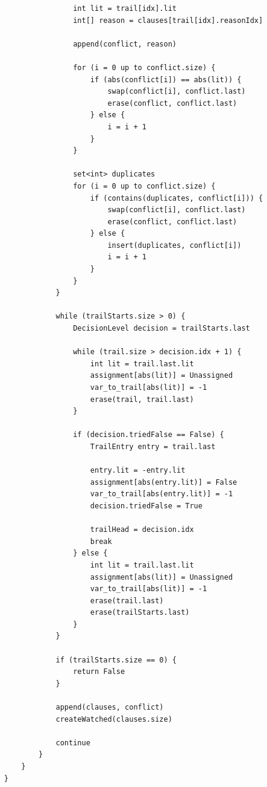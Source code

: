 \documentclass[oneside]{book}
\begin{document}
\begin{lstlisting}
                    int lit = trail[idx].lit
                    int[] reason = clauses[trail[idx].reasonIdx]

                    append(conflict, reason)

                    for (i = 0 up to conflict.size) {
                        if (abs(conflict[i]) == abs(lit)) {
                            swap(conflict[i], conflict.last)
                            erase(conflict, conflict.last)
                        } else {
                            i = i + 1
                        }
                    }

                    set<int> duplicates
                    for (i = 0 up to conflict.size) {
                        if (contains(duplicates, conflict[i])) {
                            swap(conflict[i], conflict.last)
                            erase(conflict, conflict.last)
                        } else {
                            insert(duplicates, conflict[i])
                            i = i + 1
                        }
                    }
                }

                while (trailStarts.size > 0) {
                    DecisionLevel decision = trailStarts.last

                    while (trail.size > decision.idx + 1) {
                        int lit = trail.last.lit
                        assignment[abs(lit)] = Unassigned
                        var_to_trail[abs(lit)] = -1
                        erase(trail, trail.last)
                    }

                    if (decision.triedFalse == False) {
                        TrailEntry entry = trail.last

                        entry.lit = -entry.lit
                        assignment[abs(entry.lit)] = False
                        var_to_trail[abs(entry.lit)] = -1
                        decision.triedFalse = True

                        trailHead = decision.idx
                        break
                    } else {
                        int lit = trail.last.lit
                        assignment[abs(lit)] = Unassigned
                        var_to_trail[abs(lit)] = -1
                        erase(trail.last)
                        erase(trailStarts.last)
                    }
                }

                if (trailStarts.size == 0) {
                    return False
                }

                append(clauses, conflict)
                createWatched(clauses.size)

                continue
            }
        }
    }
\end{lstlisting}
\end{document}
